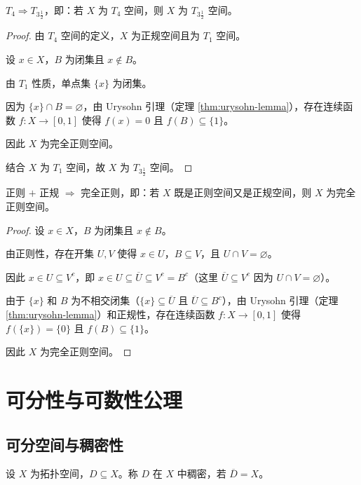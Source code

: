 \documentclass[lang=cn,a4paper,newtx,figureplace=section,tableplace=section]{elegantbook}
\begin{document}
\begin{corollary}\label{cor:T4-implies-T3.5}
$T_4 \Rightarrow T_{3\frac{1}{2}}$，即：若 $X$ 为 $T_4$ 空间，则 $X$ 为 $T_{3\frac{1}{2}}$ 空间。
\end{corollary}
\begin{proof}
由 $T_4$ 空间的定义，$X$ 为正规空间且为 $T_1$ 空间。

设 $x \in X$，$B$ 为闭集且 $x \notin B$。

由 $T_1$ 性质，单点集 $\{x\}$ 为闭集。

因为 $\{x\} \cap B = \varnothing$，由 Urysohn 引理（定理 \ref{thm:urysohn-lemma}），存在连续函数 $f: X \to [0,1]$ 使得 $f(x) = 0$ 且 $f(B) \subseteq \{1\}$。

因此 $X$ 为完全正则空间。

结合 $X$ 为 $T_1$ 空间，故 $X$ 为 $T_{3\frac{1}{2}}$ 空间。
\end{proof}

\begin{corollary}\label{cor:regular-normal-implies-completely-regular}
正则 $+$ 正规 $\Rightarrow$ 完全正则，即：若 $X$ 既是正则空间又是正规空间，则 $X$ 为完全正则空间。
\end{corollary}
\begin{proof}
设 $x \in X$，$B$ 为闭集且 $x \notin B$。

由正则性，存在开集 $U, V$ 使得 $x \in U$，$B \subseteq V$，且 $U \cap V = \varnothing$。

因此 $x \in U \subseteq V^c$，即 $x \in U \subseteq \overline{U} \subseteq V^c = B^c$（这里 $\overline{U} \subseteq V^c$ 因为 $U \cap V = \varnothing$）。

由于 $\{x\}$ 和 $B$ 为不相交闭集（$\{x\} \subseteq \overline{U}$ 且 $\overline{U} \subseteq B^c$），由 Urysohn 引理（定理 \ref{thm:urysohn-lemma}）和正规性，存在连续函数 $f: X \to [0,1]$ 使得 $f(\{x\}) = \{0\}$ 且 $f(B) \subseteq \{1\}$。

因此 $X$ 为完全正则空间。
\end{proof}

\chapter{可分性与可数性公理}

\section{可分空间与稠密性}

\begin{definition}[稠密]\label{def:dense}
设 $X$ 为拓扑空间，$D \subseteq X$。称 $D$ 在 $X$ 中稠密，若 $\overline{D} = X$。
\end{definition}
\end{document}
